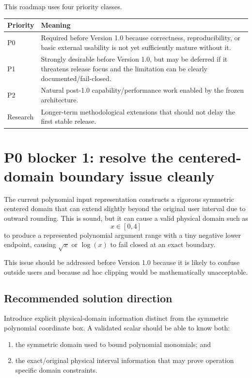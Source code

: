 \documentclass[11pt]{article}
\begin{document}
This roadmap uses four priority classes.

\begin{longtable}{p{}p{}}
\toprule
Priority & Meaning \\
\midrule
\endhead
P0 & Required before Version 1.0 because correctness, reproducibility, or basic external usability is not yet sufficiently mature without it. \\
P1 & Strongly desirable before Version 1.0, but may be deferred if it threatens release focus and the limitation can be clearly documented/fail-closed. \\
P2 & Natural post-1.0 capability/performance work enabled by the frozen architecture. \\
Research & Longer-term methodological extensions that should not delay the first stable release. \\
\bottomrule
\end{longtable}

\section{P0 blocker 1: resolve the centered-domain boundary issue cleanly}

The current polynomial input representation constructs a rigorous symmetric
centered domain that can extend slightly beyond the original user interval due to
outward rounding.  This is sound, but it can cause a valid physical domain such
as
\[
  x\in[0,4]
\]
to produce a represented polynomial argument range with a tiny negative lower
endpoint, causing \(\sqrt{x}\) or \(\log(x)\) to fail closed at an exact boundary.

This issue should be addressed before Version 1.0 because it is likely to confuse
outside users and because ad hoc clipping would be mathematically unacceptable.

\subsection{Recommended solution direction}

Introduce explicit physical-domain information distinct from the symmetric
polynomial coordinate box.  A validated scalar should be able to know both:
\begin{enumerate}[leftmargin=*]
\item the symmetric domain used to bound polynomial monomials; and
\item the exact/original physical interval information that may prove operation
specific domain constraints.
\end{enumerate}
\end{document}
